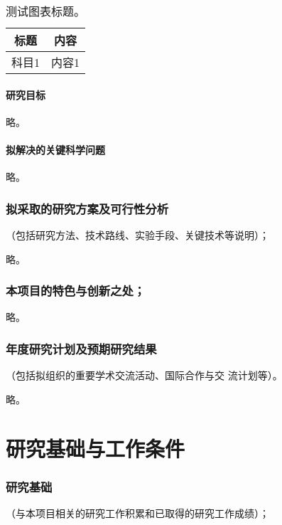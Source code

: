 \documentclass[subfig,boldtoc]{mynsfc}
\begin{document}
\begin{table}[h]
  \centering
  \begin{tabular}{cc}
    \hline
    标题 & 内容 \\
    \hline
    科目1 & 内容1 \\
    \hline
  \end{tabular}
  \caption{测试图表标题。}
  \label{tab:test}
\end{table}

\subsection{研究目标}
\label{sec:goals}

略。

\subsection{拟解决的关键科学问题}

略。

\section{拟采取的研究方案及可行性分析}{（包括研究方法、技术路线、实验手段、关键技术等说明）；}
\label{sec:approach}

略。

\section{本项目的特色与创新之处； }{}
\label{sec:innovation}

略。

\section{年度研究计划及预期研究结果}{（包括拟组织的重要学术交流活动、国际合作与交
  流计划等）。}
\label{sec:plans}

略。

\part{研究基础与工作条件}
\label{cha:foundations}

\section{研究基础}{（与本项目相关的研究工作积累和已取得的研究工作成绩）；}
\label{sec:achievements}
\end{document}
